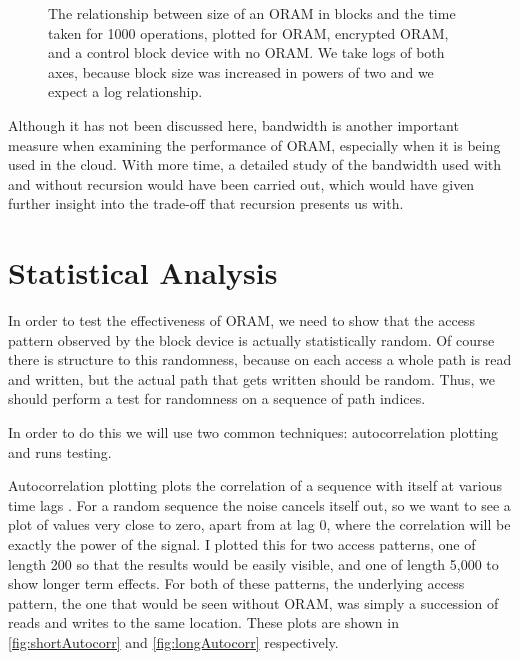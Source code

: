 \documentclass[12pt,a4paper,twoside,openright]{report}
\begin{document}
\begin{figure}
    \centering
    
    \caption{The relationship between size of an ORAM in blocks and the time taken for 1000 operations, plotted for ORAM, encrypted ORAM, and a control block device with no ORAM. We take logs of both axes, because block size was increased in powers of two and we expect a log relationship.}
    \label{fig:timeResults}
\end{figure}



Although it has not been discussed here, bandwidth is another important measure when examining the performance of ORAM, especially when it is being used in the cloud. With more time, a detailed study of the bandwidth used with and without recursion would have been carried out, which would have given further insight into the trade-off that recursion presents us with.

\section{Statistical Analysis}
\label{sec:statisticalAnalysis}

In order to test the effectiveness of ORAM, we need to show that the access pattern observed by the block device is actually statistically random. Of course there is structure to this randomness, because on each access a whole path is read and written, but the actual path that gets written should be random. Thus, we should perform a test for randomness on a sequence of path indices.

In order to do this we will use two common techniques: autocorrelation plotting and runs testing.

Autocorrelation plotting plots the correlation of a sequence with itself at various time lags \cite{nistautocorr}. For a random sequence the noise cancels itself out, so we want to see a plot of values very close to zero, apart from at lag 0, where the correlation will be exactly the power of the signal. I plotted this for two access patterns, one of length 200 so that the results would be easily visible, and one of length 5,000 to show longer term effects. For both of these patterns, the underlying access pattern, the one that would be seen without ORAM, was simply a succession of reads and writes to the same location. These plots are shown in \cref{fig:shortAutocorr} and \cref{fig:longAutocorr} respectively.
\end{document}
